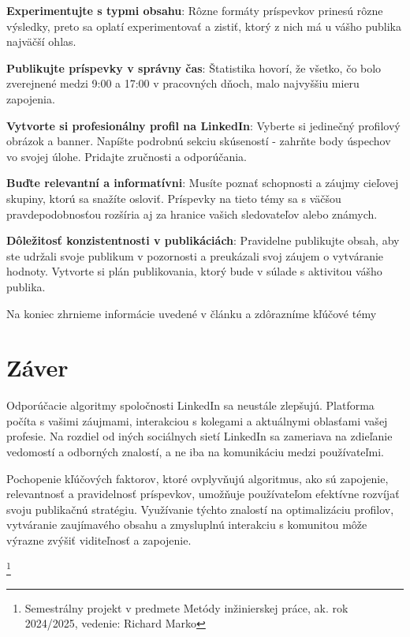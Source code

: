 \documentclass[slovak,a4paper]{coursepaper}
\begin{document}
\textbf{Experimentujte s typmi obsahu}: Rôzne formáty príspevkov prinesú rôzne výsledky, preto sa oplatí experimentovať a zistiť, ktorý z nich má u vášho publika najväčší ohlas.

\textbf{Publikujte príspevky v správny čas}:
Štatistika hovorí, že všetko, čo bolo zverejnené medzi 9:00 a 17:00 v pracovných dňoch, malo najvyššiu mieru zapojenia.~\cite{12}

\textbf{Vytvorte si profesionálny profil na LinkedIn}: Vyberte si jedinečný profilový obrázok a banner. Napíšte podrobnú sekciu skúseností - zahrňte body úspechov vo svojej úlohe.
Pridajte zručnosti a odporúčania.

\textbf{Buďte relevantní a informatívni}: Musíte poznať schopnosti a záujmy cieľovej skupiny, ktorú sa snažíte osloviť. Príspevky na tieto témy sa s väčšou pravdepodobnosťou rozšíria aj za hranice vašich sledovateľov alebo známych.

\textbf{Dôležitosť konzistentnosti v publikáciách}: Pravidelne publikujte obsah, aby ste udržali svoje publikum v pozornosti a preukázali svoj záujem o vytváranie hodnoty. Vytvorte si plán publikovania, ktorý bude v súlade s aktivitou vášho publika.\cite{13}

Na koniec zhrnieme informácie uvedené v článku a zdôrazníme kľúčové témy

\section{Záver} \label{zaver}
Odporúčacie algoritmy spoločnosti LinkedIn sa neustále zlepšujú. Platforma počíta s vašimi záujmami, interakciou s kolegami a aktuálnymi oblasťami vašej profesie. Na rozdiel od iných sociálnych sietí LinkedIn sa zameriava na zdieľanie vedomostí a odborných znalostí, a ne iba na komunikáciu medzi používateľmi.

Pochopenie kľúčových faktorov, ktoré ovplyvňujú algoritmus, ako sú zapojenie, relevantnosť a pravidelnosť príspevkov, umožňuje používateľom efektívne rozvíjať svoju publikačnú stratégiu. Využívanie týchto znalostí na optimalizáciu profilov, vytváranie zaujímavého obsahu a zmysluplnú interakciu s komunitou môže výrazne zvýšiť viditeľnosť a zapojenie.

\thanks{Semestrálny projekt v predmete Metódy inžinierskej práce, ak. rok 2024/2025, vedenie: Richard Marko}



\end{document}
